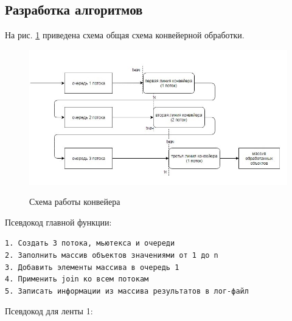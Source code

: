 \documentclass[a4paper,12pt]{article}
\begin{document}
\subsection{Разработка алгоритмов}

На рис. \ref{fig:insert} приведена схема 
общая схема конвейерной обработки.
        
\begin{figure}[h!]
\begin{center}
{\includegraphics[width=\textwidth]{img/conv.jpg}}
\caption{
Схема работы конвейера}
\label{fig:insert}
\end{center}
\end{figure}

Псевдокод главной функции:

\begin{flushleft}
\texttt{1. Создать 3 потока, мьютекса и очереди\\
2. Заполнить массив объектов значениями от 1 до n\\
3. Добавить элементы массива в очередь 1\\
4. Применить join ко всем потокам\\
5. Записать информации из массива результатов в лог-файл\\
}
\end{flushleft}

Псевдокод для ленты 1:
\end{document}
